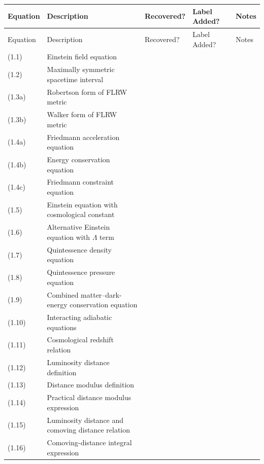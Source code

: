 \documentclass{article}
\newcommand{\done}{\textcolor{green!60!black}{\ding{51}}}
\begin{document}
\begin{longtable}{|p{1.8cm}|p{6.2cm}|p{2.2cm}|p{2.2cm}|p{2.5cm}|}
\hline
Equation & Description & Recovered? & Label Added? & Notes \\
\hline
\endfirsthead

\hline
Equation & Description & Recovered? & Label Added? & Notes \\
\hline
\endhead

(1.1) & Einstein field equation & \done & \done & \\
(1.2) & Maximally symmetric spacetime interval & \done & \done & \\
(1.3a) & Robertson form of FLRW metric  & \done & \done & \\
(1.3b) & Walker form of FLRW metric  & \done & \done & \\
(1.4a) & Friedmann acceleration equation  & \done & \done & \\
(1.4b) & Energy conservation equation  & \done & \done & \\
(1.4c) & Friedmann constraint equation  & \done & \done & \\
(1.5) & Einstein equation with cosmological constant  & \done & \done & \\
(1.6) & Alternative Einstein equation with $\Lambda$ term  & \done & \done & \\
(1.7) & Quintessence density equation & \done & \done & \\
(1.8) & Quintessence pressure equation & \done & \done & \\
(1.9) & Combined matter--dark-energy conservation equation & \done & \done & \\
(1.10) & Interacting adiabatic equations & \done & \done & \\
(1.11) & Cosmological redshift relation & \done & \done & \\
(1.12) & Luminosity distance definition & \done & \done & \\
(1.13) & Distance modulus definition & \done & \done & \\
(1.14) & Practical distance modulus expression & \done & \done & \\
(1.15) & Luminosity distance and comoving distance relation & \done & \done & \\
(1.16) & Comoving-distance integral expression & \done & \done & \\


\end{longtable}
\end{document}
